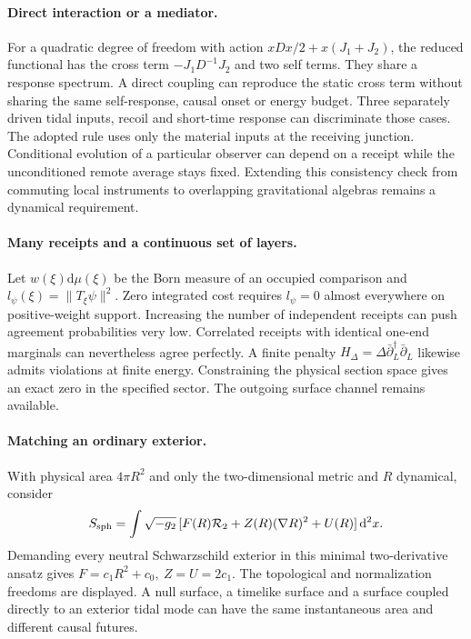 \documentclass[11pt,a4paper]{article}
\newcommand{\dd}{\mathrm d}
\begin{document}
\paragraph{Direct interaction or a mediator.}
For a quadratic degree of freedom with action \(xDx/2+x(J_1+J_2)\), the reduced functional has the cross term \(-J_1D^{-1}J_2\) and two self terms. They share a response spectrum. A direct coupling can reproduce the static cross term without sharing the same self-response, causal onset or energy budget. Three separately driven tidal inputs, recoil and short-time response can discriminate those cases. The adopted rule uses only the material inputs at the receiving junction. Conditional evolution of a particular observer can depend on a receipt while the unconditioned remote average stays fixed. Extending this consistency check from commuting local instruments to overlapping gravitational algebras remains a dynamical requirement.

\paragraph{Many receipts and a continuous set of layers.}
Let \(w(\xi)\dd\mu(\xi)\) be the Born measure of an occupied comparison and \(l_\psi(\xi)=\|T_\xi\psi\|^2\). Zero integrated cost requires \(l_\psi=0\) almost everywhere on positive-weight support. Increasing the number of independent receipts can push agreement probabilities very low. Correlated receipts with identical one-end marginals can nevertheless agree perfectly. A finite penalty \(H_\Delta=\Delta\bar\partial_L^\dagger\bar\partial_L\) likewise admits violations at finite energy. Constraining the physical section space gives an exact zero in the specified sector. The outgoing surface channel remains available.

\paragraph{Matching an ordinary exterior.}
With physical area \(4\pi R^2\) and only the two-dimensional metric and \(R\) dynamical, consider
\[
 S_{\rm sph}=\int\sqrt{-g_2}\,[F(R){\cal R}_2+Z(R)(\nabla R)^2+U(R)]\,\dd^2x .
\]
Demanding every neutral Schwarzschild exterior in this minimal two-derivative ansatz gives \(F=c_1R^2+c_0,\ Z=U=2c_1\). The topological and normalization freedoms are displayed. A null surface, a timelike surface and a surface coupled directly to an exterior tidal mode can have the same instantaneous area and different causal futures.
\end{document}
